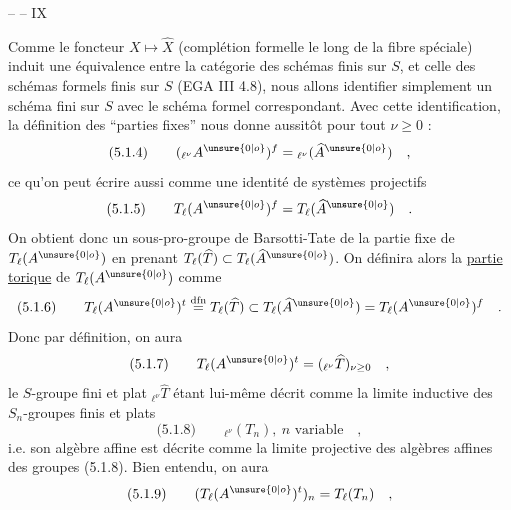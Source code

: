 \hfill --  -- \hfill IX

Comme le foncteur $X\longmapsto\widehat X$ (complétion formelle le long de la fibre spéciale) induit une équivalence entre la catégorie des schémas finis sur $S$, et celle des schémas formels finis sur $S$ (EGA III 4.8), nous allons identifier simplement un schéma fini sur $S$ avec le schéma formel correspondant. Avec cette identification, la définition des ``parties fixes'' nous donne aussitôt pour tout $\nu\geq0$ :
\[
\text{(5.1.4)}\qquad ({}_{\ell^\nu}A^{\unsure{0|o}})^f={}_{\ell^\nu}(\widehat A^{\unsure{0|o}})\quad ,
\]
ce qu'on peut écrire aussi comme une identité de systèmes projectifs
\[
\text{(5.1.5)}\qquad T_\ell(A^{\unsure{0|o}})^f=T_\ell(\widehat A^{\unsure{0|o}})\quad .
\]
On obtient donc un sous-pro-groupe de Barsotti-Tate de la partie fixe de $T_\ell(A^{\unsure{0|o}})$ en prenant $T_\ell(\widehat T)\subset T_\ell(\widehat A^{\unsure{0|o}})$. On définira alors la \uline{partie torique} de $T_\ell(A^{\unsure{0|o}})$ comme
\[
\text{(5.1.6)}\qquad T_\ell(A^{\unsure{0|o}})^t\overset{\mathrm{dfn}}=T_\ell(\widehat T)\subset T_\ell(\widehat A^{\unsure{0|o}})=T_\ell(A^{\unsure{0|o}})^f\quad .
\]
Donc par définition, on aura
\[
\text{(5.1.7)}\qquad T_\ell(A^{\unsure{0|o}})^t=({}_{\ell^\nu}\widehat T)_{\nu\geq0}\quad ,
\]
le $S$-groupe fini et plat ${}_{\ell^\nu}\widehat T$ étant lui-même décrit comme la limite inductive des $S_n$-groupes finis et plats
\[
\text{(5.1.8)}\qquad {}_{\ell^\nu}(T_n),\ n\text{ variable}\quad ,
\]
i.e. son algèbre affine est décrite comme la limite projective des algèbres affines des groupes (5.1.8). Bien entendu, on aura
\[
\text{(5.1.9)}\qquad (T_\ell(A^{\unsure{0|o}})^t)_n=T_\ell(T_n)\quad ,
\]

